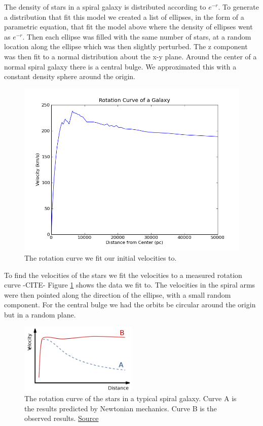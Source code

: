 \documentclass{article}
\begin{document}
The density of stars in a spiral galaxy is distributed according to $e^{-r}$. To generate a distribution that fit this model we created a list of ellipses, in the form of a parametric equation, that fit the model above where the density of ellipses went as $e^{-r}$. Then each ellipse was filled with the same number of stars, at a random location along the ellipse which was then slightly perturbed. The z component was then fit to a normal distribution about the x-y plane. Around the center of a normal spiral galaxy there is a central bulge. We approximated this with a constant density sphere around the origin.

\begin{figure}[Ht!]
\centering
\includegraphics[width=.8\columnwidth]{rotation_curve.png}
\caption{The rotation curve we fit our initial velocities to. \cite{velocity-distributions} } 
\label{fig:vel}
\end{figure}
To find the velocities of the stars we fit the velocities to a measured rotation curve -CITE- Figure \ref{fig:vel} shows the data we fit to. The velocities in the spiral arms were then pointed along the direction of the ellipse, with a small random component. For the central bulge we had the orbits be circular around the origin but in a random plane. 

\begin{figure}[Ht!]
 \centering
 \includegraphics[width=0.5\textwidth]{./rotation.png}
  \caption{The rotation curve of the stars in a typical spiral galaxy. Curve A is the results predicted by Newtonian mechanics. Curve B is the observed results. \href{http://en.wikipedia.org/wiki/Galaxy_rotation_curve}{Source}}
 \label{fig:rot}
\end{figure}
\end{document}
